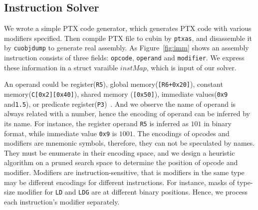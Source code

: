 \subsection{Instruction Solver}

We wrote a simple PTX code generator, which generates PTX code with various modifiers specified.
Then compile PTX file to cubin by {\tt ptxas}, and disassemble it by {\tt cuobjdump} to generate real assembly. 
As Figure~\ref{fig:imm} shows an assembly instruction consists of three fields: {\tt opcode}, {\tt operand} and {\tt modifier}. We express these information in a struct
varaible $instMap$, which is input of our solver.

An operand could be register({\tt R5}), 
global memory({\tt [R6+0x20]}), constant memory({\tt C[0x2][0x40]}), shared memory ({\tt [0x50]}),
immediate values({\tt 0x9} and{\tt1.5}), or predicate register({\tt P3})~\cite{ptx2015isa}. %
And we observe the name of operand is always related with a number, hence the encoding of operand can be inferred by its name.
For instance, the register operand {\tt R5} is inferred as $101$ in binary format, while immediate value {\tt 0x9} is $1001$. 
The encodings of opcodes and modifiers are mnemonic symbols, therefore, they can not be speculated by names. 
They must be enumerate in their encoding space, and we design a heuristic algorithm on a pruned search space to
determine the position of opcode and modifier.
Modifiers are instruction-sensitive, that is modifiers in the same type may be different encodings for different instructions. 
For instance, masks of type-size
modifier for {\tt LD} and {\tt LDG} are at different binary positions. Hence, we process each instruction's modifier separately. 


